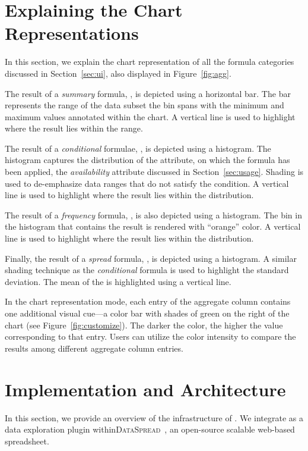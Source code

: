 \section*{Explaining the Chart Representations}

In this section, we explain the chart representation of all the
formula categories discussed in Section~\ref{sec:ui},
also displayed in Figure~\ref{fig:agg}.

 The result of a \emph{summary} formula,
\eg {}, is depicted using a horizontal bar.
The bar represents
the range of the data subset the bin spans
with the minimum and maximum values
annotated within the chart. A vertical line is used to highlight
where the result lies within the range.
   
 The result of a \emph{conditional} formulae,
\eg {}, is depicted using a histogram.
The histogram captures the distribution of the attribute,
on which the formula has been applied,
\eg the \emph{availability} attribute discussed
in Section~\ref{sec:usage}.
Shading is used to de-emphasize data ranges
that do not satisfy the condition. A vertical line is used to highlight
where the result lies within the distribution.

 The result of a \emph{frequency} formula,
\eg {}, is also depicted using a histogram.
The bin in the histogram
that contains the result is rendered with ``orange'' color.
A vertical line is used to highlight
where the result lies within the distribution.

 Finally, the result of a \emph{spread} formula,
\eg {}, is depicted using a histogram.
A similar shading technique as the \emph{conditional} formula is used to highlight the standard deviation. The mean of the is highlighted using a vertical line.

In the chart representation mode,
each entry of the aggregate column
contains one additional visual cue---a color bar
with shades of green on
the right of the chart (see Figure~\ref{fig:customize}).
The darker the color, the higher the value corresponding to that entry. 
Users can utilize the color intensity
to compare the results among different aggregate column entries.

\section*{Implementation and  Architecture}
\label{sec:sys}
In this section, we provide an overview of the infrastructure of \noah. 
We integrate \noah as a data exploration plugin within{\scshape DataSpread}~\cite{dataspread}, 
an open-source scalable web-based spreadsheet.

